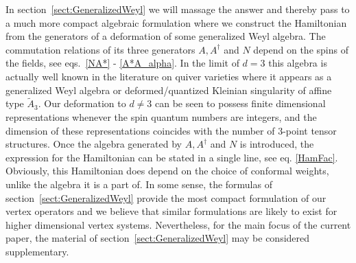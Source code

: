 \documentclass{article}
\begin{document}
In section~\ref{sect:GeneralizedWeyl} we will massage the answer and thereby pass to a much 
more compact algebraic formulation where we construct the Hamiltonian from 
the generators
of a deformation of some generalized Weyl algebra. The commutation relations of 
its three generators $A, A^\dagger$ and $N$ depend on the spins of the fields, 
see eqs.\ \eqref{NA*} - \eqref{A*A_alpha}. In the limit of $d=3$ this algebra 
is actually well known in the literature on quiver varieties where it appears 
as a generalized Weyl algebra or deformed/quantized Kleinian singularity of 
affine type $\tilde A_3$. Our deformation to $d \neq 3$ can be seen to possess 
finite dimensional representations whenever the spin quantum numbers are 
integers, and the dimension of these representations coincides with the 
number of 3-point tensor structures. Once the algebra generated by $A, A^\dagger$ and $N$ is 
introduced, the expression for the Hamiltonian can be stated in a single 
line, see eq. \eqref{HamFac}. Obviously, this Hamiltonian does depend on 
the choice of conformal weights, unlike the algebra it is a part of. In some 
sense, the formulas of section~\ref{sect:GeneralizedWeyl} provide the most 
compact formulation of our vertex operators and we believe that similar 
formulations are likely to exist for higher dimensional vertex systems. 
Nevertheless, for the main focus of the current paper, the material of 
section~\ref{sect:GeneralizedWeyl} may be considered supplementary. 
\end{document}
